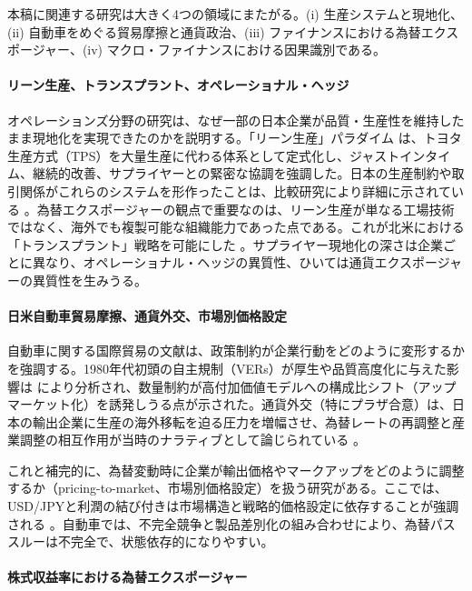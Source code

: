 \documentclass[12pt,a4paper]{article}
\begin{document}
本稿に関連する研究は大きく4つの領域にまたがる。(i) 生産システムと現地化、(ii) 自動車をめぐる貿易摩擦と通貨政治、(iii) ファイナンスにおける為替エクスポージャー、(iv) マクロ・ファイナンスにおける因果識別である。

\paragraph{リーン生産、トランスプラント、オペレーショナル・ヘッジ}

オペレーションズ分野の研究は、なぜ一部の日本企業が品質・生産性を維持したまま現地化を実現できたのかを説明する。「リーン生産」パラダイム \citep{womack1990} は、トヨタ生産方式（TPS）を大量生産に代わる体系として定式化し、ジャストインタイム、継続的改善、サプライヤーとの緊密な協調を強調した。日本の生産制約や取引関係がこれらのシステムを形作ったことは、比較研究により詳細に示されている \citep{cusumano1985,ohno1988}。為替エクスポージャーの観点で重要なのは、リーン生産が単なる工場技術ではなく、海外でも複製可能な組織能力であった点である。これが北米における「トランスプラント」戦略を可能にした \citep{rubenstein1992}。サプライヤー現地化の深さは企業ごとに異なり、オペレーショナル・ヘッジの異質性、ひいては通貨エクスポージャーの異質性を生みうる。

\paragraph{日米自動車貿易摩擦、通貨外交、市場別価格設定}

自動車に関する国際貿易の文献は、政策制約が企業行動をどのように変形するかを強調する。1980年代初頭の自主規制（VERs）が厚生や品質高度化に与えた影響は \citet{feenstra1984} により分析され、数量制約が高付加価値モデルへの構成比シフト（アップマーケット化）を誘発しうる点が示された。通貨外交（特にプラザ合意）は、日本の輸出企業に生産の海外移転を迫る圧力を増幅させ、為替レートの再調整と産業調整の相互作用が当時のナラティブとして論じられている \citep{funabashi1988}。

これと補完的に、為替変動時に企業が輸出価格やマークアップをどのように調整するか（pricing-to-market、市場別価格設定）を扱う研究がある。ここでは、USD/JPYと利潤の結び付きは市場構造と戦略的価格設定に依存することが強調される \citep{krugman1987,knetter1993,goldbergknetter1997}。自動車では、不完全競争と製品差別化の組み合わせにより、為替パススルーは不完全で、状態依存的になりやすい。

\paragraph{株式収益率における為替エクスポージャー}
\end{document}
